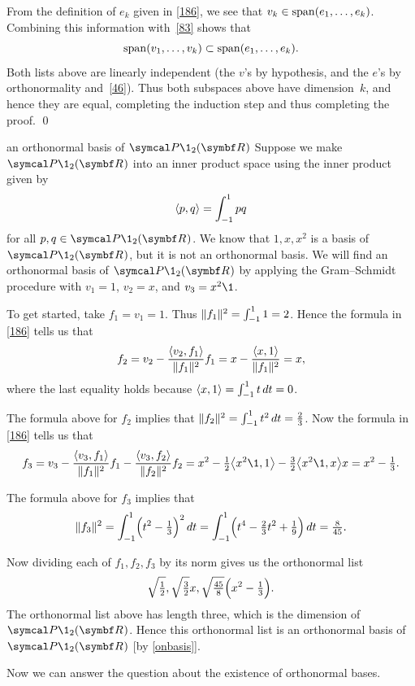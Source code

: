 From the definition of $e_k$ given in \ref{186}, we see that $v_k \in \operatorname{span} (e_1, \dots, e_k)$.  Combining this
information with~\ref{83} shows that
\[
\operatorname{span} (v_1, \dots, v_k) \subset \operatorname{span} (e_1, \dots, e_k).
\]
Both lists above are linearly independent (the $v$'s by hypothesis, and the $e$'s by orthonormality and~\ref{46}).  Thus both subspaces above have dimension~$k$, and
hence they are equal, completing the induction step and thus completing the proof.
\qed

\pagebreak[3]

\begin{example}[obP2R]{an orthonormal basis of\/ $\P\1_2(\R{})$}
Suppose we make $\P\1_2(\R{})$ into an inner product space using the inner product given by
\[
\langle p, q\rangle = \int_{-1}^{1} pq
\]
for all $p, q \in \P\1_2(\R{})$. We know that $1, x, x^2$ is a basis of $\P\1_2(\R{})$, but it is not an orthonormal basis. We will find an orthonormal basis of $\P\1_2(\R{})$ by applying the Gram--Schmidt procedure with $v_1 = 1$, $v_2 = x$, and $v_3 = x^2\1$.

To get started, take $f_1 = v_1 = 1$. Thus $\lVert f_1\rVert^2 = \int_{-1}^1 1 = 2$. Hence the formula in \ref{186} tells us that
\[
f_2 = v_2 - \frac{\ip{v_2, f_1}}{\norm{f_1}^2} f_1 = x - \frac{\ip{x, 1}}{\norm{f_1}^2} = x,
\]
where the last equality holds because $\langle x, 1\rangle = \int_{-1}^1 t \, dt = 0$.

The formula above for $f_2$ implies that $\norm{f_2}^2 = \int_{-1}^1 t^2 \, dt = \frac{2}{3}$. Now the formula in \ref{186} tells us that
\[
f_3 = v_3 - \frac{\ip{v_3, f_1}}{\norm{f_1}^2} f_1 - \frac{\ip{v_3, f_2}}{\norm{f_2}^2} f_2
= x^2 - \tfrac{1}{2} \ip[\big]{x^2\1, 1} - \tfrac{3}{2}\ip[\big]{x^2\1, x} x
= x^2 - \tfrac{1}{3}.
\]

The formula above for $f_3$ implies that
\[
\norm{f_3}^2 = \int_{-1}^1 \paren[\Big]{t^2 - \tfrac{1}{3} }^2 \, dt =  \int_{-1}^{1} \paren[\Big]{ t^4 -\tfrac{2}{3} t^2 + \tfrac{1}{9} } \, dt = \tfrac{8}{45}.
\]

Now dividing each of $f_1, f_2, f_3$ by its norm gives us the orthonormal list
\[
\sqrt{\tfrac{1}{2}}, \sqrt{\tfrac{3}{2}} x,
\sqrt{\tfrac{45}{8}} \paren[\Big]{ x^2 - \tfrac{1}{3} }.
\]
The orthonormal list above has length three, which is the dimension of $\P\1_2(\R{})$. Hence this orthonormal list is an orthonormal basis of~$\P\1_2(\R{})$ [by \ref{onbasis}].
\end{example}

Now we can answer the question about the existence of orthonormal bases.

